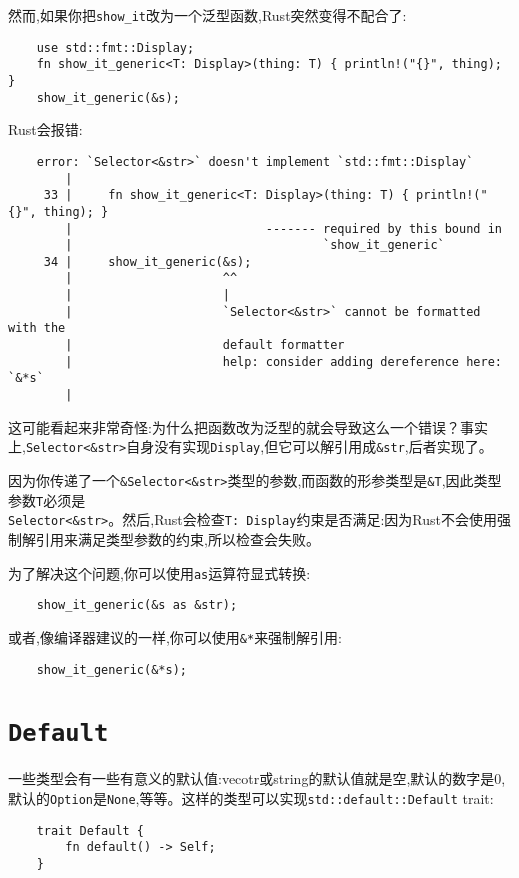 然而,如果你把\texttt{show\_it}改为一个泛型函数,Rust突然变得不配合了:
\begin{verbatim}
    use std::fmt::Display;
    fn show_it_generic<T: Display>(thing: T) { println!("{}", thing); }
    show_it_generic(&s);
\end{verbatim}

Rust会报错:
\begin{verbatim}
    error: `Selector<&str>` doesn't implement `std::fmt::Display`
        |
     33 |     fn show_it_generic<T: Display>(thing: T) { println!("{}", thing); }
        |                           ------- required by this bound in
        |                                   `show_it_generic`
     34 |     show_it_generic(&s);
        |                     ^^
        |                     |
        |                     `Selector<&str>` cannot be formatted with the
        |                     default formatter
        |                     help: consider adding dereference here: `&*s`
        |
\end{verbatim}

这可能看起来非常奇怪:为什么把函数改为泛型的就会导致这么一个错误？事实上,\texttt{Selector<\&str>}自身没有实现\texttt{Display},但它可以解引用成\texttt{\&str},后者实现了。

因为你传递了一个\texttt{\&Selector<\&str>}类型的参数,而函数的形参类型是\texttt{\&T},因此类型参数\texttt{T}必须是\\
\texttt{Selector<\&str>}。然后,Rust会检查\texttt{T: Display}约束是否满足:因为Rust不会使用强制解引用来满足类型参数的约束,所以检查会失败。

为了解决这个问题,你可以使用\texttt{as}运算符显式转换:
\begin{verbatim}
    show_it_generic(&s as &str);
\end{verbatim}

或者,像编译器建议的一样,你可以使用\texttt{\&*}来强制解引用:
\begin{verbatim}
    show_it_generic(&*s);
\end{verbatim}

\section{\texttt{Default}}\label{default}

一些类型会有一些有意义的默认值:vecotr或string的默认值就是空,默认的数字是0,默认的\texttt{Option}是\texttt{None},等等。这样的类型可以实现\texttt{std::default::Default} trait:
\begin{verbatim}
    trait Default {
        fn default() -> Self;
    }
\end{verbatim}

